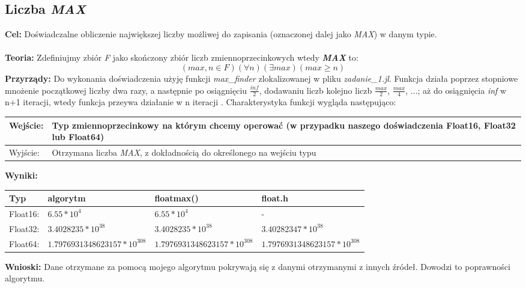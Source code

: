 \documentclass{article}
\begin{document}
\subsection{Liczba \textit{MAX}}
\noindent \textbf{Cel:} Doświadczalne obliczenie największej liczby możliwej do zapisania (oznaczonej dalej jako \textit{MAX}) w danym typie.\\\\
\noindent \textbf{Teoria:} Zdefiniujmy zbiór \textit{F} jako skończony zbiór liczb zmiennoprzecinkowych wtedy {\textbf{\textit{MAX}}} to:
$$ (max,n \in F)(\forall n)(\exists max)(max \geq n) $$
\noindent \textbf{Przyrządy:} Do wykonania doświadczenia użyję funkcji \textit{max\_finder} zlokalizowanej w pliku \textit{zadanie\_1.jl}. Funkcja działa poprzez stopniowe mnożenie początkowej liczby dwa razy, a następnie po osiągnięciu $\frac{\textit{inf}}{2}$, dodawaniu liczb kolejno liczb $\frac{max}{2}$, $\frac{max}{4}$, ...; aż do osiągnięcia \textit{inf} w n+1 iteracji, wtedy funkcja przeywa działanie w n iteracji . Charakterystyka funkcji wygląda następująco:\\
\begin{center}
  \begin{tabular}{|p{3cm}|p{8cm}|} \hline
    Wejście: & Typ zmiennoprzecinkowy na którym chcemy operować (w przypadku naszego doświadczenia Float16, Float32 lub Float64) \\
    \hline \hline
    Wyjście: & Otrzymana liczba \textit{MAX}, z dokładnością do określonego na wejściu typu \\
    \hline
  \end{tabular}
\end{center}
\noindent \textbf{Wyniki:}
\begin{center}
  \begin{tabular}{|p{}|p{}|p{}|p{}|} \hline
    \textbf{Typ} & \textbf{algorytm} & \textbf{floatmax()} & \textbf{float.h} \\
    \hline
    Float16: & $6.55*10^{4}$ &  $6.55*10^{4}$ & - \\
    \hline
    Float32: & $3.4028235*10^{38}$ &  $3.4028235*10^{38}$ & $3.40282347*10^{38}$ \\
    \hline
    Float64: &$1.7976931348623157*10^{308}$ & $1.7976931348623157*10^{308}$ & $1.7976931348623157*10^{308}$\\
    \hline
  \end{tabular}
\end{center}
\noindent \textbf{Wnioski:} Dane otrzymane za pomocą mojego algorytmu pokrywają się z danymi otrzymanymi z innych źródeł. Dowodzi to poprawności algorytmu.
\end{document}
